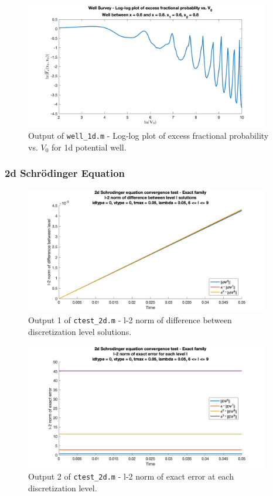 \documentclass[10pt]{article}
\def\code#1{\texttt{#1}} %
\begin{document}
\begin{figure}[H]
\centering
\includegraphics[width=0.95\textwidth]{problem1/well_1d.png}
\caption{Output of \code{well\_1d.m} - 
Log-log plot of excess fractional probability vs. $V_0$ for 1d potential well.}
\end{figure}

\subsubsection*{2d Schrödinger Equation}


\begin{figure}[H]
\centering
\includegraphics[width=0.95\textwidth]{problem2/ctest_2d-1.png}
\caption{Output 1 of \code{ctest\_2d.m} - 
l-2 norm of difference between discretization level solutions.}
\end{figure}

\begin{figure}[H]
\centering
\includegraphics[width=0.95\textwidth]{problem2/ctest_2d-2.png}
\caption{Output 2 of \code{ctest\_2d.m} - 
l-2 norm of exact error at each discretization level.}
\end{figure}
\end{document}
